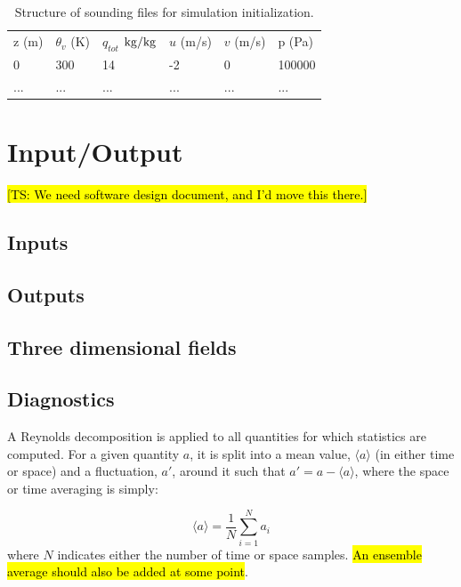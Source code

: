 \documentclass{report}
\begin{document}
\begin{table}[t]
\centering
{\footnotesize
\caption[short]{Structure of sounding files for simulation initialization.}
\label{tab:DeltaDefinitionsTable}
\begin{tabular*}{\textwidth}{ @{\extracolsep{\fill}} llllll}
\hline
\hline
z (m) & $\theta_v$ (K) & $q_{tot}$ $\rm {kg/kg}$ & $u$ (m/s) & $v$ (m/s) & p (Pa)\\
0 & 300 & 14  & -2 & 0 & 100000\\
... & ... & ...  & ... & ... & ...\\
\hline
\hline
\end{tabular*}
}
\end{table}

\chapter{Input/Output}

\hl{[TS: We need software design document, and I'd move this there.]}

\section{Inputs}

\section{Outputs}
\section{Three dimensional fields}


\section{Diagnostics}

A Reynolds decomposition is applied to all quantities for which statistics are computed. For a given quantity $a$, it is split into a mean value, $\langle a \rangle$  (in either time or space) and a fluctuation, $a'$, around it such that $a' = a - \langle a \rangle$, where the space or time averaging is simply:

\begin{equation}
    \langle a \rangle = \frac{1}{N} \sum_{i=1}^N a_i
\end{equation}
where $N$ indicates either the number of time or space samples. \hl{An ensemble average should also be added at some point}.
\end{document}
